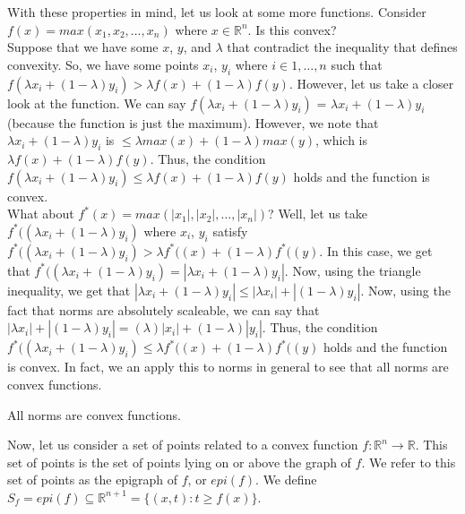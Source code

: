 \documentclass[11pt]{article}
\begin{document}
With these properties in mind, let us look at some more functions.  Consider $f(x) = max(x_{1}, x_{2}, \ldots, x_{n})$ where $x \in \mathbb{R}^{n}$.  Is this convex?\\

Suppose that we have some $x$, $y$, and $\lambda$ that contradict the inequality that defines convexity.  So, we have some points $x_{i}$, $y_{i}$ where $i \in 1, \ldots, n$  such that $f(\lambda x_{i} + (1-\lambda)y_{i}) > \lambda f(x) + (1-\lambda)f(y)$.  However, let us take a closer look at the function.  We can say $f(\lambda x_{i} + (1-\lambda)y_{i})$ = $\lambda x_{i} + (1-\lambda)y_{i}$ (because the function is just the maximum).  However, we note that $\lambda x_{i} + (1-\lambda)y_{i}$ is $\leq \lambda max(x) + (1-\lambda)max(y)$, which is $\lambda f(x) + (1-\lambda)f(y)$.  Thus, the condition $f(\lambda x_{i} + (1-\lambda)y_{i}) \leq \lambda f(x) + (1-\lambda)f(y)$ holds and the function is convex.\\

What about $f^{*}(x) = max(|x_{1}|, |x_{2}|, \ldots, |x_{n}|)$?  Well, let us take $f^{*}((\lambda x_{i} + (1-\lambda)y_{i})$ where $x_{i}$, $y_{i}$ satisfy $f^{*}((\lambda x_{i} + (1-\lambda)y_{i}) > \lambda f^{*}((x) + (1-\lambda)f^{*}((y)$.  In this case, we get that $f^{*}((\lambda x_{i} + (1-\lambda)y_{i}) = |\lambda x_{i} + (1-\lambda)y_{i}|$.  Now, using the triangle inequality, we get that $|\lambda x_{i} + (1-\lambda)y_{i}| \leq |\lambda x_{i}| + |(1-\lambda)y_{i}|$.  Now, using the fact that norms are absolutely scaleable, we can say that $|\lambda x_{i}| + |(1-\lambda)y_{i}| = (\lambda)|x_{i}| + (1-\lambda)|y_{i}|$.  Thus, the condition $f^{*}((\lambda x_{i} + (1-\lambda)y_{i}) \leq \lambda f^{*}((x) + (1-\lambda)f^{*}((y)$ holds and the function is convex.  In fact, we an apply this to norms in general to see that all norms are convex functions.

\begin{theorem}
All norms are convex functions.
\end{theorem}

Now, let us consider a set of points related to a convex function $f: \mathbb{R}^n \longrightarrow \mathbb{R}$.  This set of points is the set of points lying on or above the graph of $f$.  We refer to this set of points as the epigraph of $f$, or $epi(f)$.  We define $S_{f} = epi(f) \subseteq \mathbb{R}^{n+1} = \{(x, t): t \geq f(x)\}$.\\

\smallskip
\end{document}
